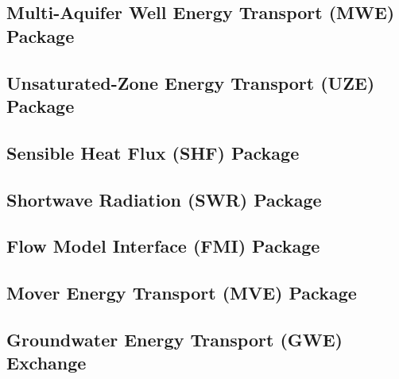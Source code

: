 \newpage
\subsection{Multi-Aquifer Well Energy Transport (MWE) Package}


\newpage
\subsection{Unsaturated-Zone Energy Transport (UZE) Package}


\newpage
\subsection{Sensible Heat Flux (SHF) Package}


\newpage
\subsection{Shortwave Radiation (SWR) Package}


\newpage
\subsection{Flow Model Interface (FMI) Package}


\newpage
\subsection{Mover Energy Transport (MVE) Package}


\newpage
\subsection{Groundwater Energy Transport (GWE) Exchange}


